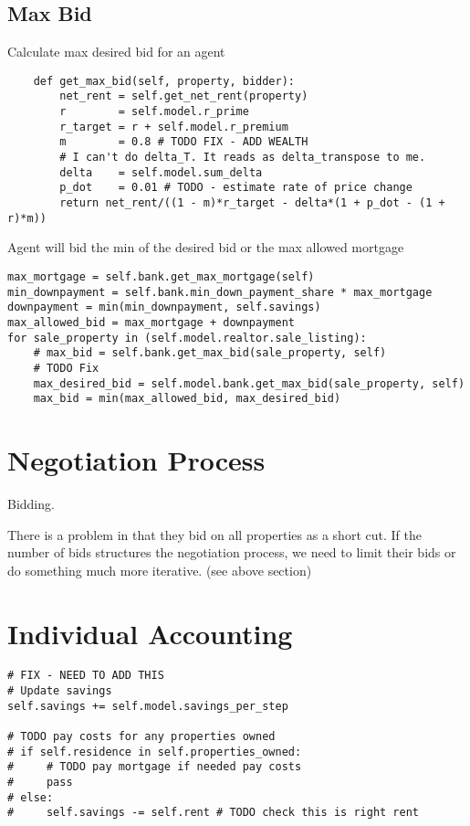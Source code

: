 \subsection{Max Bid}

Calculate max desired bid for an agent
\begin{lstlisting}
    def get_max_bid(self, property, bidder):
        net_rent = self.get_net_rent(property)
        r        = self.model.r_prime   
        r_target = r + self.model.r_premium
        m        = 0.8 # TODO FIX - ADD WEALTH
        # I can't do delta_T. It reads as delta_transpose to me.
        delta    = self.model.sum_delta 
        p_dot    = 0.01 # TODO - estimate rate of price change
        return net_rent/((1 - m)*r_target - delta*(1 + p_dot - (1 + r)*m))
\end{lstlisting}

Agent will bid the min of the desired bid or the max allowed mortgage
\begin{lstlisting}
max_mortgage = self.bank.get_max_mortgage(self)
min_downpayment = self.bank.min_down_payment_share * max_mortgage
downpayment = min(min_downpayment, self.savings)
max_allowed_bid = max_mortgage + downpayment
for sale_property in (self.model.realtor.sale_listing):
    # max_bid = self.bank.get_max_bid(sale_property, self)
    # TODO Fix
    max_desired_bid = self.model.bank.get_max_bid(sale_property, self)
    max_bid = min(max_allowed_bid, max_desired_bid)
\end{lstlisting}

\section{Negotiation Process}

Bidding.

There is a problem in that they bid on all properties as a short cut. If the number of bids structures the negotiation process, we need to limit their bids or do something much more iterative. (see above section)




\section{Individual Accounting}

\begin{lstlisting}
# FIX - NEED TO ADD THIS
# Update savings
self.savings += self.model.savings_per_step

# TODO pay costs for any properties owned
# if self.residence in self.properties_owned:
#     # TODO pay mortgage if needed pay costs
#     pass
# else:
#     self.savings -= self.rent # TODO check this is right rent
\end{lstlisting}
